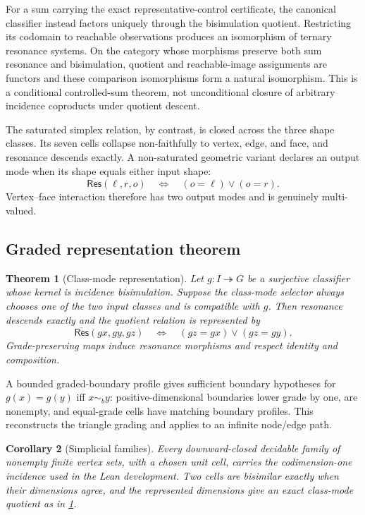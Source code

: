\documentclass[11pt]{article}
\newtheorem{theorem}{Theorem}[section]
\newtheorem{corollary}[theorem]{Corollary}
\theoremstyle{definition}
\newcommand{\Res}{\mathsf{Res}}
\newcommand{\Bis}{\mathrel{\sim_{\!b}}}
\begin{document}
For a sum carrying the exact representative-control certificate, the
canonical classifier instead factors uniquely through the bisimulation
quotient.  Restricting its codomain to reachable observations produces an
isomorphism of ternary resonance systems.  On the category whose morphisms
preserve both sum resonance and bisimulation, quotient and reachable-image
assignments are functors and these comparison isomorphisms form a natural
isomorphism.  This is a conditional controlled-sum theorem, not unconditional
closure of arbitrary incidence coproducts under quotient descent.

The saturated simplex relation, by contrast, is closed across the three shape
classes.  Its seven cells collapse non-faithfully to vertex, edge, and face,
and resonance descends exactly.  A non-saturated geometric variant declares an
output mode when its shape equals either input shape:
\[
\overline{\Res}(\ell,r,o)\quad\Longleftrightarrow\quad
(o=\ell)\lor(o=r).
\]
Vertex--face interaction therefore has two output modes and is genuinely
multi-valued.

\subsection{Graded representation theorem}

\begin{theorem}[Class-mode representation]\label{thm:graded}
Let $g:I\twoheadrightarrow G$ be a surjective classifier whose kernel is
incidence bisimulation.  Suppose the class-mode selector always chooses one of
the two input classes and is compatible with $g$.  Then resonance descends
exactly and the quotient relation is represented by
\[
\overline{\Res}(g x,g y,g z)
\quad\Longleftrightarrow\quad
(g z=g x)\lor(g z=g y).
\]
Grade-preserving maps induce resonance morphisms and respect identity and
composition.
\end{theorem}

A bounded graded-boundary profile gives sufficient boundary hypotheses for
$g(x)=g(y)$ iff $x\Bis y$: positive-dimensional boundaries lower grade by one,
are nonempty, and equal-grade cells have matching boundary profiles.  This
reconstructs the triangle grading and applies to an infinite node/edge path.

\begin{corollary}[Simplicial families]
Every downward-closed decidable family of nonempty finite vertex sets, with a
chosen unit cell, carries the codimension-one incidence used in the Lean
development.  Two cells are bisimilar exactly when their dimensions agree, and
the represented dimensions give an exact class-mode quotient as in
\cref{thm:graded}.
\end{corollary}
\end{document}
